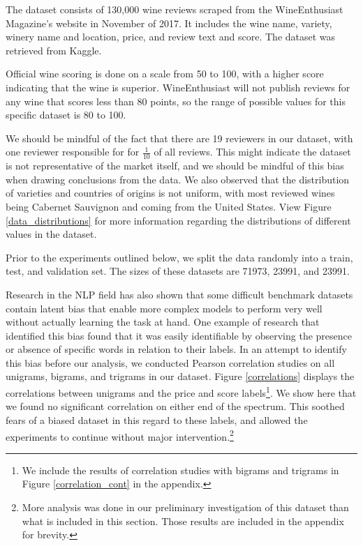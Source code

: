 \documentclass[12pt]{IEEEtran}
\begin{document}
    The dataset consists of 130,000 wine reviews scraped from the WineEnthusiast Magazine's website in November of 2017. It includes the wine name, variety, winery name and location, price, and review text and score. The dataset was retrieved from Kaggle\cite{data}. \par
    Official wine scoring is done on a scale from 50 to 100, with a higher score indicating that the wine is superior\cite{wine_scoring}. WineEnthusiast will not publish reviews for any wine that scores less than 80 points, so the range of possible values for this specific dataset is 80 to 100. \par
    We should be mindful of the fact that there are 19 reviewers in our dataset, with one reviewer responsible for for $\frac{1}{10}$ of all reviews. This might indicate the dataset is not representative of the market itself, and we should be mindful of this bias when drawing conclusions from the data.
    We also observed that the distribution of varieties and countries of origins is not uniform, with most reviewed wines being Cabernet Sauvignon and coming from the United States. View Figure \ref{data_distributions} for more information regarding the distributions of different values in the dataset. \par
    Prior to the experiments outlined below, we split the data randomly into a train, test, and validation set. The sizes of these datasets are 71973, 23991, and 23991. \par
    Research in the NLP field has also shown that some difficult benchmark datasets contain latent bias that enable more complex models to perform very well without actually learning the task at hand. One example of research that identified this bias found that it was easily identifiable by observing the presence or absence of specific words in relation to their labels\cite{clever_hans}. In an attempt to identify this bias before our analysis, we conducted Pearson correlation studies on all unigrams, bigrams, and trigrams in our dataset. Figure \ref{correlations} displays the correlations between unigrams and the price and score labels\footnote{We include the results of correlation studies with bigrams and trigrams in Figure \ref{correlation_cont} in the appendix.}. We show here that we found no significant correlation on either end of the spectrum. This soothed fears of a biased dataset in this regard to these labels, and allowed the experiments to continue without major intervention.\footnote{More analysis was done in our preliminary investigation of this dataset than what is included in this section. Those results are included in the appendix for brevity.} \par
\end{document}
